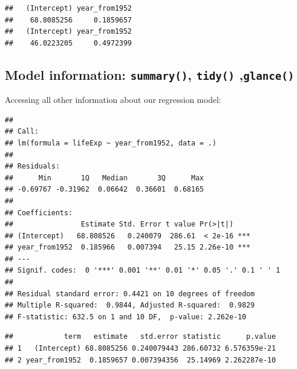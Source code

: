 \documentclass[]{book}
\makeatletter
\newenvironment{Shaded}{\begin{snugshade}}{\end{snugshade}}
\newcommand{\KeywordTok}[1]{\textcolor[rgb]{0.13,0.29,0.53}{\textbf{#1}}}
\newcommand{\StringTok}[1]{\textcolor[rgb]{0.31,0.60,0.02}{#1}}
\newcommand{\OperatorTok}[1]{\textcolor[rgb]{0.81,0.36,0.00}{\textbf{#1}}}
\newcommand{\NormalTok}[1]{#1}
\newenvironment{kframe}{%
\medskip{}
\setlength{\fboxsep}{.8em}
 \def\at@end@of@kframe{}%
 \ifinner\ifhmode%
  \def\at@end@of@kframe{\end{minipage}}%
  \begin{minipage}{\columnwidth}%
 \fi\fi%
 \def\FrameCommand##1{\hskip\@totalleftmargin \hskip-\fboxsep
 \colorbox{shadecolor}{##1}\hskip-\fboxsep
     \hskip-\linewidth \hskip-\@totalleftmargin \hskip\columnwidth}%
 \MakeFramed {\advance\hsize-\width
   \@totalleftmargin\z@ \linewidth\hsize
   \@setminipage}}%
 {\par\unskip\endMakeFramed%
 \at@end@of@kframe}
\renewenvironment{Shaded}{\begin{kframe}}{\end{kframe}}
\makeatother
\begin{document}
\begin{verbatim}
##   (Intercept) year_from1952 
##    68.8085256     0.1859657 
##   (Intercept) year_from1952 
##    46.0223205     0.4972399
\end{verbatim}

\subsection{\texorpdfstring{Model information: \texttt{summary()},
\texttt{tidy()}
,\texttt{glance()}}{Model information: summary(), tidy() ,glance()}}\label{model-information-summary-tidy-glance}

Accessing all other information about our regression model:

\begin{Shaded}
\end{Shaded}

\begin{verbatim}
## 
## Call:
## lm(formula = lifeExp ~ year_from1952, data = .)
## 
## Residuals:
##      Min       1Q   Median       3Q      Max 
## -0.69767 -0.31962  0.06642  0.36601  0.68165 
## 
## Coefficients:
##                Estimate Std. Error t value Pr(>|t|)    
## (Intercept)   68.808526   0.240079  286.61  < 2e-16 ***
## year_from1952  0.185966   0.007394   25.15 2.26e-10 ***
## ---
## Signif. codes:  0 '***' 0.001 '**' 0.01 '*' 0.05 '.' 0.1 ' ' 1
## 
## Residual standard error: 0.4421 on 10 degrees of freedom
## Multiple R-squared:  0.9844, Adjusted R-squared:  0.9829 
## F-statistic: 632.5 on 1 and 10 DF,  p-value: 2.262e-10
\end{verbatim}

\begin{Shaded}
\end{Shaded}

\begin{verbatim}
##            term   estimate   std.error statistic      p.value
## 1   (Intercept) 68.8085256 0.240079443 286.60732 6.576359e-21
## 2 year_from1952  0.1859657 0.007394356  25.14969 2.262287e-10
\end{verbatim}
\end{document}
